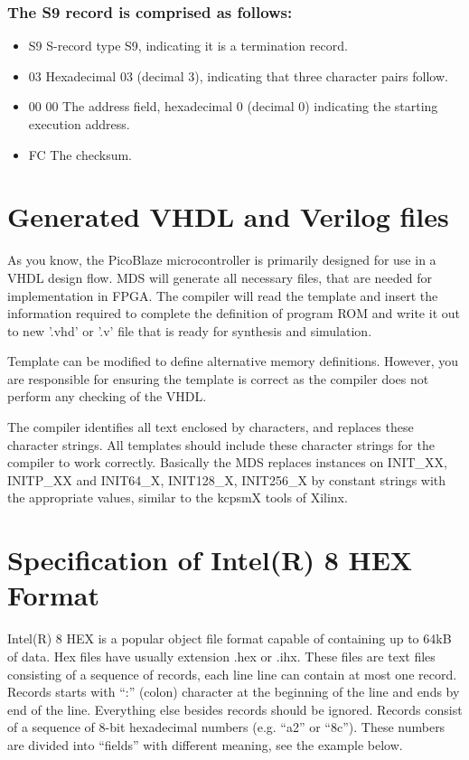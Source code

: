     \subsubsection{The S9 record is comprised as follows:}
        \begin{itemize}
            \item S9 S-record type S9, indicating it is a termination record.
            \item 03 Hexadecimal 03 (decimal 3), indicating that three character pairs follow.
            \item 00 00 The address field, hexadecimal 0 (decimal 0) indicating the starting execution address.
            \item FC The checksum.
        \end{itemize}

\section{Generated VHDL and Verilog files}
    As you know, the PicoBlaze microcontroller is primarily designed for use in a VHDL design flow. MDS will generate all necessary files, that are needed for implementation in FPGA. The compiler will read the template and insert the information required to complete the definition of program ROM and write it out to new '.vhd' or '.v' file that is ready for synthesis and simulation.

    Template can be modified to define alternative memory definitions. However, you are responsible for ensuring the template is correct as the compiler does not perform any checking of the VHDL.

    The compiler identifies all text enclosed by {} characters, and replaces these character strings. All templates should include these {} character strings for the compiler to work correctly. Basically the MDS replaces instances on {INIT\_XX}, {INITP\_XX} and {INIT64\_X}, {INIT128\_X}, {INIT256\_X} by constant strings with the appropriate values, similar to the kcpsmX tools of Xilinx.

\section{Specification of Intel(R) 8 HEX Format}
    Intel(R) 8 HEX is a popular object file format capable of containing up to 64kB of data. Hex files have usually extension .hex or .ihx. These files are text files consisting of a sequence of records, each line line can contain at most one record. Records starts with ``:'' (colon) character at the beginning of the line and ends by end of the line. Everything else besides records should be ignored. Records consist of a sequence of 8-bit hexadecimal numbers (e.g. ``a2'' or ``8c''). These numbers are divided into ``fields'' with different meaning, see the example below.

